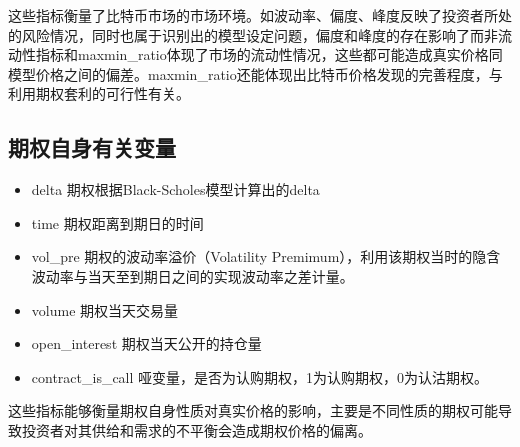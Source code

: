     这些指标衡量了比特币市场的市场环境。如波动率、偏度、峰度反映了投资者所处的风险情况，同时也属于识别出的模型设定问题，偏度和峰度的存在影响了而非流动性指标和maxmin\_ratio体现了市场的流动性情况，这些都可能造成真实价格同模型价格之间的偏差。maxmin\_ratio还能体现出比特币价格发现的完善程度，与利用期权套利的可行性有关。
    \subsection{期权自身有关变量}
    \begin{itemize}
        \item delta 期权根据Black-Scholes模型计算出的delta
        \item time 期权距离到期日的时间
        \item vol\_pre 期权的波动率溢价（Volatility Premimum），利用该期权当时的隐含波动率与当天至到期日之间的实现波动率之差计量。
        \item volume 期权当天交易量                                     
        
        \item open\_interest 期权当天公开的持仓量
        \item contract\_is\_call 哑变量，是否为认购期权，1为认购期权，0为认沽期权。 
    \end{itemize}
    这些指标能够衡量期权自身性质对真实价格的影响，主要是不同性质的期权可能导致投资者对其供给和需求的不平衡会造成期权价格的偏离。

